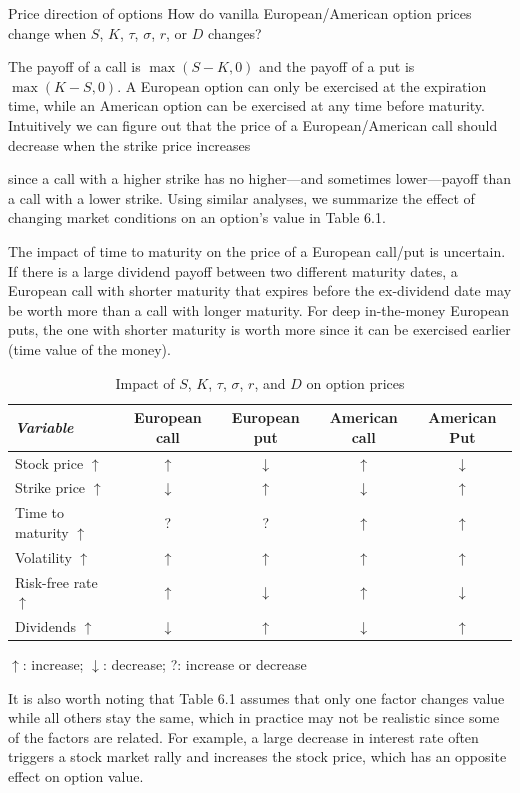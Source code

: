 \begin{problem}{Price direction of options}
How do vanilla European/American option prices change when $S$, $K$, $\tau$, $\sigma$, $r$,
or $D$ changes?
\end{problem}

\begin{solution}
The payoff of a call is $\max(S-K,0)$ and the payoff of a put is $\max(K-S,0)$.
A European option can only be exercised at the expiration time, while an American
option can be exercised at any time before maturity. Intuitively we can figure out that
the price of a European/American call should decrease when the strike price increases

since a call with a higher strike has no higher---and sometimes lower---payoff than a call
with a lower strike. Using similar analyses, we summarize the effect of changing market
conditions on an option's value in Table 6.1.

The impact of time to maturity on the price of a European call/put is uncertain. If there is
a large dividend payoff between two different maturity dates, a European call with
shorter maturity that expires before the ex-dividend date may be worth more than a call
with longer maturity. For deep in-the-money European puts, the one with shorter
maturity is worth more since it can be exercised earlier (time value of the money).

\begin{table}[H]
\centering
\small
\begin{tabular}{|l|c|c|c|c|}
\hline
\emph{Variable} & European call & European put & American call & American Put \\
\hline
Stock price $\uparrow$ & $\uparrow$ & $\downarrow$ & $\uparrow$ & $\downarrow$ \\
\hline
Strike price $\uparrow$ & $\downarrow$ & $\uparrow$ & $\downarrow$ & $\uparrow$ \\
\hline
Time to maturity $\uparrow$ & ? & ? & $\uparrow$ & $\uparrow$ \\
\hline
Volatility $\uparrow$ & $\uparrow$ & $\uparrow$ & $\uparrow$ & $\uparrow$ \\
\hline
Risk-free rate $\uparrow$ & $\uparrow$ & $\downarrow$ & $\uparrow$ & $\downarrow$ \\
\hline
Dividends $\uparrow$ & $\downarrow$ & $\uparrow$ & $\downarrow$ & $\uparrow$ \\
\hline
\end{tabular}
\caption{Impact of $S$, $K$, $\tau$, $\sigma$, $r$, and $D$ on option prices}
\label{tab:zhou-table-6-1}
\end{table}

$\uparrow$: increase; $\downarrow$: decrease; ?: increase or decrease

It is also worth noting that Table 6.1 assumes that only one factor changes value while
all others stay the same, which in practice may not be realistic since some of the factors
are related. For example, a large decrease in interest rate often triggers a stock market
rally and increases the stock price, which has an opposite effect on option value.
\end{solution}

